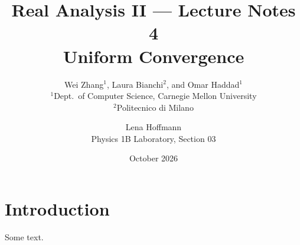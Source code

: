 \documentclass{article}
\title{Real Analysis II --- Lecture Notes 4\\\large Uniform Convergence}
\author{Wei Zhang$^{1}$, Laura Bianchi$^{2}$, and Omar Haddad$^{1}$\\
$^{1}$Dept.\ of Computer Science, Carnegie Mellon University\\
$^{2}$Politecnico di Milano \and Lena Hoffmann\\\small Physics 1B Laboratory, Section 03}
\date{\small October 2026}
\begin{document}
\maketitle
\section{Introduction}
Some text.
\end{document}
